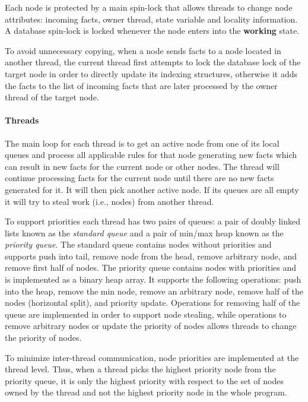 Each node is protected by a main spin-lock that allows threads to
change node attributes: incoming facts, owner thread, state variable
and locality information.  A database spin-lock is locked whenever the
node enters into the \textbf{working} state.  

To avoid unnecessary copying, when a node sends facts to a node
located in another thread, the current thread first attempts to lock
the database lock of the target node in order to directly update its
indexing structures, otherwise it adds the facts to the list of
incoming facts that are later processed by the owner thread of the
target node.

\paragraph{Threads}

The main loop for each thread is to get an active node from one of its
local queues and process all applicable rules for that node generating
new facts which can result in new facts for the current node or other
nodes.  The thread will continue processing facts for the current node
until there are no new facts generated for it.  It will then pick
another active node.  If its queues are all empty it will try to steal
work (i.e., nodes) from another thread.

To support priorities each thread has two pairs of queues: a pair of
doubly linked lists known as the \emph{standard queue} and a pair of
min/max heap known as the \emph{priority queue}.  The standard queue
contains nodes without priorities and supports push into tail, remove
node from the head, remove arbitrary node, and remove first half of
nodes.  The priority queue contains nodes with priorities and is
implemented as a binary heap array. It supports the following
operations: push into the heap, remove the min node, remove an
arbitrary node, remove half of the nodes (horizontal split), and
priority update.  Operations for removing half of the queue are
implemented in order to support node stealing, while operations to
remove arbitrary nodes or update the priority of nodes allows threads
to change the priority of nodes.

To minimize inter-thread communication, node priorities are
implemented at the thread level. Thus, when a thread picks the highest
priority node from the priority queue, it is only the highest priority
with respect to the set of nodes owned by the thread and not the
highest priority node in the whole program.  

